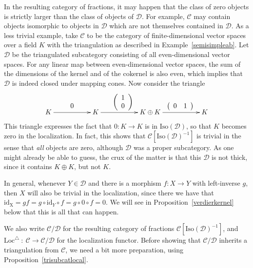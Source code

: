 \documentclass{amsproc}
\theoremstyle{definition}
\begin{document}
In the resulting category of fractions, it may happen that the class of zero objects is strictly larger than the class of objects of ${\mathcal{D}}$. For example, ${\mathcal{C}}$ may contain objects isomorphic to objects in ${\mathcal{D}}$ which are not themselves contained in ${\mathcal{D}}$. As a less trivial example, take ${\mathcal{C}}$ to be the category of finite-dimensional vector spaces over a field $K$ with the triangulation as described in Example~\ref{semisimpleab}. Let ${\mathcal{D}}$ be the triangulated subcategory consisting of all even-dimensional vector spaces. For any linear map between even-dimensional vector spaces, the sum of the dimensions of the kernel and of the cokernel is also even, which implies that ${\mathcal{D}}$ is indeed closed under mapping cones. Now consider the triangle
\begin{displaymath}
\xymatrix{K\ar[rr]^{\begin{array}{c}0\end{array}} && K\ar[rr]^{\left(\begin{array}{c}1\\0\end{array}\right)} && K\oplus K\ar[rr]^(.55){\left(\begin{array}{cc}0&1\end{array}\right)} && K}
\end{displaymath}
This triangle expresses the fact that $0:K{\longrightarrow} K$ is in ${\mathrm{Iso}}({\mathcal{D}})$, so that $K$ becomes zero in the localization. In fact, this shows that ${\mathcal{C}}[{\mathrm{Iso}}({\mathcal{D}})^{-1}]$ is trivial in the sense that \emph{all} objects are zero, although ${\mathcal{D}}$ was a proper subcategory. As one might already be able to guess, the crux of the matter is that this ${\mathcal{D}}$ is not thick, since it contains $K\oplus K$, but not $K$.

In general, whenever $Y\in{\mathcal{D}}$ and there is a morphism $f:X{\longrightarrow} Y$ with left-inverse $g$, then $X$ will also be trivial in the localization, since there we have that $\mathrm{id_X}=gf=g\circ{\mathrm{id}}_Y\circ f=g\circ 0\circ f=0$. We will see in Proposition~\ref{verdierkernel} below that this is all that can happen.

We also write ${\mathcal{C}}/{\mathcal{D}}$ for the resulting category of fractions ${\mathcal{C}}[{\mathrm{Iso}}({\mathcal{D}})^{-1}]$, and ${\mathrm{Loc}}^\triangle \: : \: {\mathcal{C}}{\longrightarrow} {\mathcal{C}}/{\mathcal{D}}$ for the localization functor. Before showing that ${\mathcal{C}}/{\mathcal{D}}$ inherits a triangulation from ${\mathcal{C}}$, we need a bit more preparation, using Proposition~\ref{trisubcatlocal}.
\end{document}
